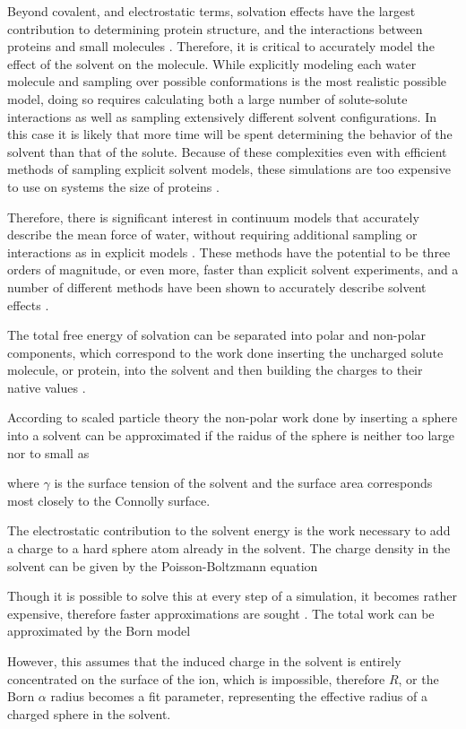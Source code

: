 Beyond covalent, and electrostatic terms, solvation effects have the largest contribution to determining protein structure, and the interactions between proteins and small molecules \cite{chothia1975principles,janin1978conformation}.
Therefore, it is critical to accurately model the effect of the solvent on the molecule.
While explicitly modeling each water molecule and sampling over possible conformations is the most realistic possible model, doing so requires calculating both a large number of solute-solute interactions as well as sampling extensively different solvent configurations.
In this case it is likely that more time will be spent determining the behavior of the solvent than that of the solute.
Because of these complexities even with efficient methods of sampling explicit solvent models, these simulations are too expensive to use on systems the size of proteins \cite{figueirido1997large,zhang2001solvent}.

Therefore, there is significant interest in continuum models that accurately describe the mean force of water, without requiring additional sampling or interactions as in explicit models \cite{zhang2001solvent,still1990semianalytical,qiu1997gb}.
These methods have the potential to be three orders of magnitude, or even more, faster than explicit solvent experiments, and a number of different methods have been shown to accurately describe solvent effects \cite{zhang2001solvent}.

The total free energy of solvation can be separated into polar and non-polar components, which correspond to the work done inserting the uncharged solute molecule, or protein, into the solvent and then building the charges to their native values \cite{roux1999implicit}.

According to scaled particle theory the non-polar work done by inserting a sphere into a solvent can be approximated if the raidus of the sphere is neither too large nor to small as

where $\gamma$ is the surface tension of the solvent and the surface area corresponds most closely to the Connolly surface.

The electrostatic contribution to the solvent energy is the work necessary to add a charge to a hard sphere atom already in the solvent.
The charge density in the solvent can be given by the Poisson-Boltzmann equation

Though it is possible to solve this at every step of a simulation, it becomes rather expensive, therefore faster approximations are sought \cite{nicholls1991rapid}.
The total work can be approximated by the Born model

However, this assumes that the induced charge in the solvent is entirely concentrated on the surface of the ion, which is impossible, therefore $R$, or the Born $\alpha$ radius becomes a fit parameter, representing the effective radius of a charged sphere in the solvent.

